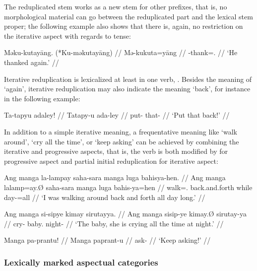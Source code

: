 The reduplicated stem works as a new stem for other prefixes, that is, no 
morphological material can go between the reduplicated part and the lexical 
stem proper; the following example also shows that there is, again, no 
restriction on the iterative aspect with regards to tense:

\ex\begingl
	\gla Məku-kutayāng. \quad \textup{(*}Ku-məkutayāng\textup{)} //
	\glb Mə-ku\til{}kuta=yāng //
	\glc \Pst{}-\Iter{}\til{}thank=\TsgM{}.\Aarg{} //
	\glft `He thanked again.' //
\endgl\xe

Iterative reduplication is lexicalized at least in one verb, 
. Besides the meaning of `again', iterative 
reduplication may also indicate the meaning `back', for instance in the 
following example:

\ex\begingl
	\gla Ta-tapyu adaley! //
	\glb Ta\til{}tapy-u ada-ley //
	\glc \Iter{}\til{}put-\Imp{} that-\PargI{} //
	\glft `Put that back!' //
\endgl\xe

In addition to a simple iterative meaning, a frequentative meaning like `walk 
around', `cry all the time', or `keep asking' can be achieved by combining the 
iterative and progressive aspects, that is, the verb is both modified by 
 for progressive aspect and partial initial reduplication for 
iterative aspect:

\pex
\a\begingl
	\gla Ang manga la-lampay saha-sara manga luga bahisya-hen. //
	\glb Ang manga la\til{}lamp=ay.Ø saha-sara manga luga bahis-ya=hen //
	\glc \AgtT{} \Prog{} \Iter{}\til{}walk=\Fsg{}.\Top{} back.and.forth 
		\Dyn{} while day-\Loc{}=all //
	\glft `I was walking around back and forth all day long.' //
\endgl

\a\begingl
	\gla Ang manga si-sipye kimay sirutayya. //
	\glb Ang manga si\til{}sip-ye kimay.Ø sirutay-ya //
	\glc \AgtT{} \Prog{} \Iter{}\til{}cry-\TsgF{} baby.\Top{} 
		night-\Loc{} //
	\glft `The baby, she is crying all the time at night.' //
\endgl

\a\begingl
	\gla Manga pa-prantu! //
	\glb Manga pa\til{}prant-u //
	\glc \Prog{} \Iter{}\til{}ask-\Imp{} //
	\glft `Keep asking!' //
\endgl

\xe


\subsubsection{Lexically marked aspectual categories}

